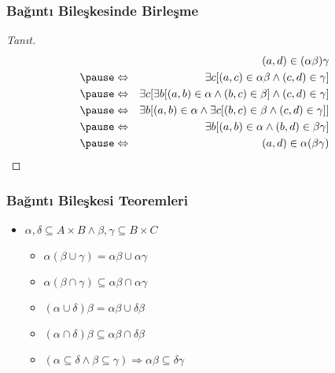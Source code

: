 \documentclass[dvipsnames]{beamer}
\theoremstyle{definition}
\theoremstyle{example}
\theoremstyle{plain}
\begin{document}
\begin{frame}
  \frametitle{Bağıntı Bileşkesinde Birleşme}

  \begin{proof}[Tanıt]
    \begin{eqnarray*}
      &                 & (a,d) \in (\alpha \beta)\gamma\\\pause
      & \Leftrightarrow & \exists c [(a,c) \in \alpha \beta
                              \wedge (c,d) \in \gamma]\\\pause
      & \Leftrightarrow & \exists c [\exists b [(a,b) \in \alpha
                                         \wedge (b,c) \in \beta]
                                         \wedge (c,d) \in \gamma]\\\pause
      & \Leftrightarrow & \exists b [(a,b) \in \alpha
                              \wedge \exists c [(b,c) \in \beta
                              \wedge (c,d) \in \gamma]]\\\pause
      & \Leftrightarrow & \exists b [(a,b) \in \alpha
                              \wedge (b,d) \in \beta \gamma]\\\pause
      & \Leftrightarrow & (a,d) \in \alpha (\beta \gamma)
    \end{eqnarray*}
  \end{proof}
\end{frame}

\begin{frame}
  \frametitle{Bağıntı Bileşkesi Teoremleri}

  \begin{itemize}
    \item $\alpha , \delta \subseteq A \times B \wedge
           \beta , \gamma \subseteq B \times C$

    \begin{itemize}
      \item $\alpha (\beta \cup \gamma) = \alpha \beta \cup \alpha \gamma$

      \pause
      \item $\alpha (\beta \cap \gamma)
        \subseteq \alpha \beta \cap \alpha \gamma$

      \pause
      \item $(\alpha \cup \delta) \beta = \alpha \beta \cup \delta \beta$

      \pause
      \item $(\alpha \cap \delta) \beta
        \subseteq \alpha \beta \cap \delta \beta$

      \pause
      \item $(\alpha \subseteq \delta \wedge \beta \subseteq \gamma)
        \Rightarrow \alpha \beta \subseteq \delta \gamma$
    \end{itemize}
  \end{itemize}
\end{frame}
\end{document}
